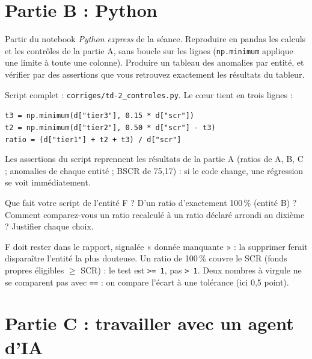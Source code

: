 \documentclass[11pt,a4paper]{article}
\newcommand{\fx}[1]{\texttt{\small #1}}
\begin{document}
\section{Partie B : Python}

\begin{exercice}[Automatiser]
Partir du notebook \emph{Python express} de la séance. Reproduire en pandas les calculs et les
contrôles de la partie A, sans boucle sur les lignes (\fx{np.minimum} applique une limite à toute
une colonne). Produire un tableau des anomalies par entité, et vérifier par des assertions que vous
retrouvez exactement les résultats du tableur.
\end{exercice}
\begin{corrige}
Script complet : \texttt{corriges/td-2\_controles.py}. Le cœur tient en trois lignes :

\smallskip
\fx{t3 = np.minimum(d["tier3"], 0.15 * d["scr"])}\\
\fx{t2 = np.minimum(d["tier2"], 0.50 * d["scr"] - t3)}\\
\fx{ratio = (d["tier1"] + t2 + t3) / d["scr"]}

\smallskip
Les assertions du script reprennent les résultats de la partie A (ratios de A, B, C ; anomalies
de chaque entité ; BSCR de 75,17) : si le code change, une régression se voit immédiatement.
\end{corrige}

\begin{exercice}
Que fait votre script de l'entité F ? D'un ratio d'exactement 100\,\% (entité B) ? Comment
comparez-vous un ratio recalculé à un ratio déclaré arrondi au dixième ? Justifier chaque choix.
\end{exercice}
\begin{corrige}
F doit rester dans le rapport, signalée « donnée manquante » : la supprimer ferait disparaître
l'entité la plus douteuse. Un ratio de 100\,\% couvre le SCR (fonds propres éligibles $\geq$ SCR) :
le test est \fx{>= 1}, pas \fx{> 1}. Deux nombres à virgule ne se comparent pas avec \fx{==} :
on compare l'écart à une tolérance (ici 0,5 point).
\end{corrige}

\section{Partie C : travailler avec un agent d'IA}
\end{document}
